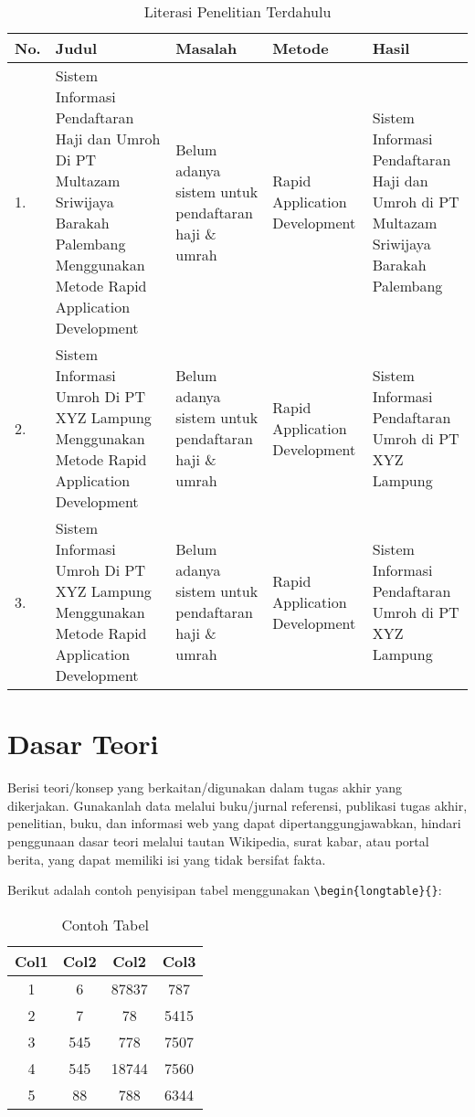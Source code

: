 \begin{longtable}{| b{}|p{}|p{}|p{}|p{}|} %
	\caption{Literasi Penelitian Terdahulu}
	\label{table:2.literasi}\\
	\hline
	\textbf{No.} & \textbf{Judul} & \textbf{Masalah} & \textbf{Metode} & \textbf{Hasil} \\
	\hline
	\endhead %
	1. & Sistem Informasi Pendaftaran Haji dan Umroh Di PT Multazam Sriwijaya Barakah Palembang Menggunakan Metode Rapid Application Development & Belum adanya sistem untuk pendaftaran haji \& umrah & Rapid Application Development & Sistem Informasi Pendaftaran Haji dan Umroh di PT Multazam Sriwijaya Barakah Palembang\\ 
	\hline
	2. & Sistem Informasi Umroh Di PT XYZ Lampung Menggunakan Metode Rapid Application Development & Belum adanya sistem untuk pendaftaran haji \& umrah & Rapid Application Development & Sistem Informasi Pendaftaran Umroh di PT XYZ Lampung\\ 
	\hline
	3. & Sistem Informasi Umroh Di PT XYZ Lampung Menggunakan Metode Rapid Application Development & Belum adanya sistem untuk pendaftaran haji \& umrah & Rapid Application Development & Sistem Informasi Pendaftaran Umroh di PT XYZ Lampung\\ 
	\hline
\end{longtable}

\section{Dasar Teori} \label{II.Teori}
Berisi teori/konsep yang berkaitan/digunakan dalam tugas akhir yang dikerjakan. Gunakanlah data melalui buku/jurnal referensi, publikasi tugas akhir, penelitian, buku, dan informasi web yang dapat dipertanggungjawabkan, hindari penggunaan dasar teori melalui tautan Wikipedia, surat kabar, atau portal berita, yang dapat memiliki isi yang tidak bersifat fakta. \par

Berikut adalah contoh penyisipan tabel menggunakan \verb|\begin{longtable}{}|: \par

\begin{longtable}{|c|c|c|c|}
	\caption{Contoh Tabel}
	\label{table:2.contoh}\\
	\hline
	Col1 & Col2 & Col2 & Col3 \\
	\hline
	\endhead
	1 & 6 & 87837 & 787 \\ 
	\hline
	2 & 7 & 78 & 5415 \\
	\hline
	3 & 545 & 778 & 7507 \\
	\hline
	4 & 545 & 18744 & 7560 \\
	\hline
	5 & 88 & 788 & 6344 \\
	\hline
\end{longtable}

